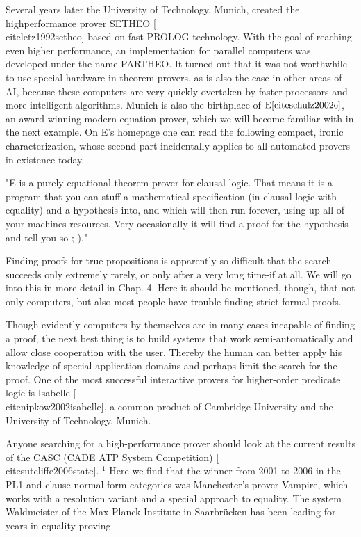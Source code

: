 \documentclass[10pt]{book}
\begin{document}
Several years later the University of Technology, Munich, created the highperformance prover SETHEO [\\cite{letz1992setheo}] based on fast PROLOG technology. With the goal of reaching even higher performance, an implementation for parallel computers was developed under the name PARTHEO. It turned out that it was not worthwhile to use special hardware in theorem provers, as is also the case in other areas of AI, because these computers are very quickly overtaken by faster processors and more intelligent algorithms. Munich is also the birthplace of $\mathrm{E}[\mathrm{\\cite{schulz2002e}]}$, an award-winning modern equation prover, which we will become familiar with in the next example. On E's homepage one can read the following compact, ironic characterization, whose second part incidentally applies to all automated provers in existence today.

\begin{displayquote}
"E is a purely equational theorem prover for clausal logic. That means it is a program that you can stuff a mathematical specification (in clausal logic with equality) and a hypothesis into, and which will then run forever, using up all of your machines resources. Very occasionally it will find a proof for the hypothesis and tell you so ;-)."
\end{displayquote}


Finding proofs for true propositions is apparently so difficult that the search succeeds only extremely rarely, or only after a very long time-if at all. We will go into this in more detail in Chap. 4. Here it should be mentioned, though, that not only computers, but also most people have trouble finding strict formal proofs.

Though evidently computers by themselves are in many cases incapable of finding a proof, the next best thing is to build systems that work semi-automatically and allow close cooperation with the user. Thereby the human can better apply his knowledge of special application domains and perhaps limit the search for the proof. One of the most successful interactive provers for higher-order predicate logic is Isabelle [\\cite{nipkow2002isabelle}], a common product of Cambridge University and the University of Technology, Munich.

Anyone searching for a high-performance prover should look at the current results of the CASC (CADE ATP System Competition) [\\cite{sutcliffe2006state}]. ${ }^{1}$ Here we find that the winner from 2001 to 2006 in the PL1 and clause normal form categories was Manchester's prover Vampire, which works with a resolution variant and a special approach to equality. The system Waldmeister of the Max Planck Institute in Saarbrücken has been leading for years in equality proving.
\end{document}
